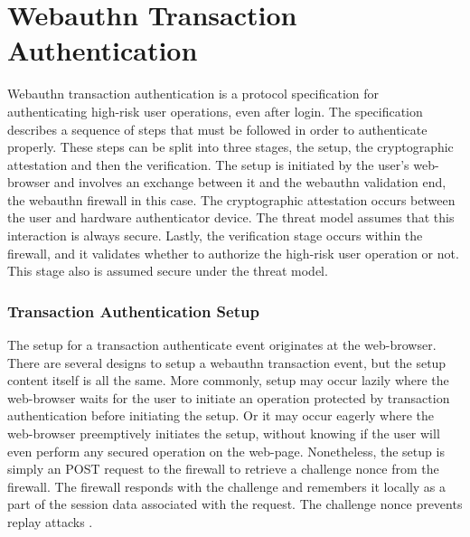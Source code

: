 \chapter{Webauthn Transaction Authentication}

Webauthn transaction authentication is a protocol specification for authenticating high-risk user operations, even after login. The specification describes a sequence of steps that must be followed in order to authenticate properly. These steps can be split into three stages, the setup, the cryptographic attestation and then the verification. The setup is initiated by the user's web-browser and involves an exchange between it and the webauthn validation end, the webauthn firewall in this case. The cryptographic attestation occurs between the user and hardware authenticator device. The threat model assumes that this interaction is always secure. Lastly, the verification stage occurs within the firewall, and it validates whether to authorize the high-risk user operation or not. This stage also is assumed secure under the threat model.

\subsection{Transaction Authentication Setup}


The setup for a transaction authenticate event originates at the web-browser. There are several designs to setup a webauthn transaction event, but the setup content itself is all the same. More commonly, setup may occur lazily where the web-browser waits for the user to initiate an operation protected by transaction authentication before initiating the setup. Or it may occur eagerly where the web-browser preemptively initiates the setup, without knowing if the user will even perform any secured operation on the web-page. Nonetheless, the setup is simply an POST request to the firewall to retrieve a challenge nonce from the firewall. The firewall responds with the challenge and remembers it locally as a part of the session data associated with the request. The challenge nonce prevents replay attacks \cite{TODO-replay-attack}. %

\iffalse
Setup can occur eagerly where the web-browser immediately performs the setup without the user initiating any operation protected by transaction authentication.

\fi
